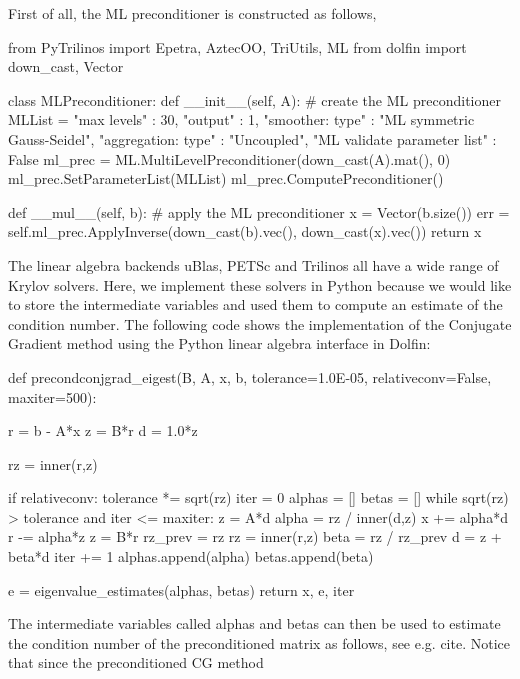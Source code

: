 First of all, the ML preconditioner is constructed as follows,  
\begin{code}
from PyTrilinos import Epetra, AztecOO, TriUtils, ML 
from dolfin import down_cast, Vector 

class MLPreconditioner: 
    def __init__(self, A): 
        # create the ML preconditioner
        MLList = {
              "max levels"        : 30, 
              "output"            : 1,  
              "smoother: type"    : "ML symmetric Gauss-Seidel",
              "aggregation: type" : "Uncoupled",
              "ML validate parameter list" : False
        }
        ml_prec = ML.MultiLevelPreconditioner(down_cast(A).mat(), 0)
        ml_prec.SetParameterList(MLList)
        ml_prec.ComputePreconditioner()

    def __mul__(self, b):
        # apply the ML preconditioner
        x = Vector(b.size())
        err = self.ml_prec.ApplyInverse(down_cast(b).vec(),
                                        down_cast(x).vec())
        return x
\end{code}
The linear algebra backends uBlas, PETSc and Trilinos all have 
a wide range of Krylov solvers. Here, we implement
these solvers in Python because we would like to store the intermediate
variables and  used them to compute an estimate of the condition number. 
The following code shows the implementation of the Conjugate Gradient method
using the Python linear algebra interface in Dolfin:
\begin{code}
def precondconjgrad_eigest(B, A, x, b, tolerance=1.0E-05, 
                           relativeconv=False, maxiter=500):

    r = b - A*x
    z = B*r
    d = 1.0*z

    rz = inner(r,z)

    if relativeconv: tolerance *= sqrt(rz)
    iter = 0
    alphas = []
    betas = []
    while sqrt(rz) > tolerance and iter <= maxiter:
        z = A*d
        alpha = rz / inner(d,z)
        x += alpha*d
        r -= alpha*z
        z = B*r
        rz_prev = rz
        rz = inner(r,z)
        beta =  rz / rz_prev
        d = z + beta*d
        iter += 1
        alphas.append(alpha)
        betas.append(beta)

    e = eigenvalue_estimates(alphas, betas)
    return x, e, iter
\end{code}
The intermediate variables called alphas and betas can then be used to estimate the condition number of
the preconditioned matrix as follows, see e.g. cite{}. 
Notice that since the preconditioned CG method 
